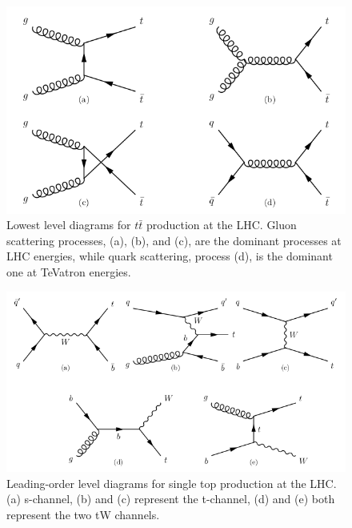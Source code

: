 \begin{figure} \label{fig-ttbarProductionLHC}
\begin{center}
\includegraphics[width=\textwidth]{Figures/ttbarProductionLHC.png}
\caption{Lowest level diagrams for $t\bar{t}$ production at the LHC. Gluon scattering processes, {(a)}, {(b)}, and {(c)}, are the dominant processes at LHC energies, while quark scattering, process {(d)}, is the dominant one at TeVatron energies. \cite{SergeyThesis}}
\end{center}
\end{figure}

\begin{figure} \label{fig-singletopProductionLHC}
\begin{center}
\includegraphics[width=\textwidth]{Figures/singletopProductionLHC.png}
\caption{Leading-order level diagrams for single top production at the LHC. {(a)} s-channel, {(b)} and {(c)} represent the t-channel, {(d)} and {(e)} both represent the two tW channels. \cite{SergeyThesis}}
\end{center}
\end{figure}

